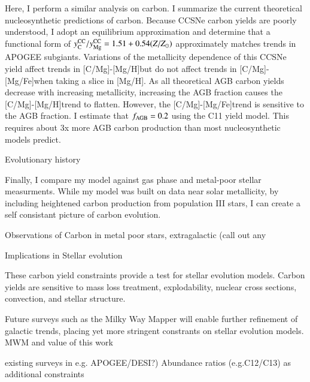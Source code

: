 \documentclass[12pt,oneside]{report}
\newcommand{\caah}{[C/Mg]-[Mg/H]}
\newcommand{\caafe}{[C/Mg]-[Mg/Fe]}
\newcommand{\Ycc}{\ensuremath{y_{\rm C}^{\rm CC}}}
\newcommand{\Yoc}{\ensuremath{y_{\rm Mg}^{\rm CC}}}
\begin{document}
Here, I perform a similar analysis on carbon. I summarize the current theoretical nucleosynthetic predictions of carbon. Because CCSNe carbon yields are poorly understood, I adopt an equilibrium approximation and determine that a functional form of $\Ycc/\Yoc=1.51 + 0.54 (Z/Z_\odot)$ approximately matches trends in APOGEE subgiants. Variations of the metallicity dependence of this CCSNe yield affect trends in \caah but do not affect trends in \caafe when taking a slice in [Mg/H]. As all theoretical AGB carbon yields decrease with increasing metallicity, increasing the AGB fraction causes the \caah trend to flatten. However, the \caafe trend is sensitive to the AGB fraction. 
I estimate that $f_{\rm AGB} = 0.2$ using the C11 yield model. This requires about 3x more AGB carbon production than most nucleosynthetic models predict.

Evolutionary history

Finally, I compare my model against gas phase and metal-poor stellar measurments. While my model was built on data near solar metallicity, by including heightened carbon production from population III stars, I can create a self consistant picture of carbon evolution.

Observations of Carbon in metal poor stars, extragalactic (call out any

Implications in Stellar evolution

These carbon yield constraints provide a test for stellar evolution models. Carbon yields are sensitive to mass loss treatment, explodability, nuclear cross sections, convection, and stellar structure. 

Future surveys such as the Milky Way Mapper will enable further refinement of galactic trends, placing yet more stringent constrants on stellar evolution models.
MWM and value of this work

existing surveys in e.g. APOGEE/DESI?)
Abundance ratios (e.g.C12/C13) as additional constraints





\newpage



\end{document}

